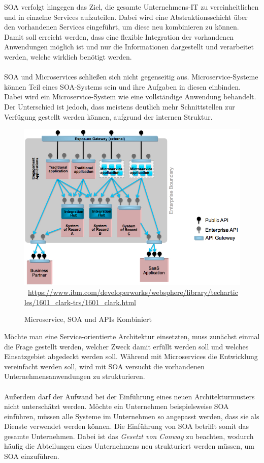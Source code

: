 SOA verfolgt hingegen das Ziel, die gesamte Unternehmens-IT zu vereinheitlichen und in einzelne Services aufzuteilen. Dabei wird eine Abstraktionsschicht über den vorhandenen Services eingeführt, um diese neu kombinieren zu können. Damit soll erreicht werden, dass eine flexible Integration der vorhandenen Anwendungen möglich ist und nur die Informationen dargestellt und verarbeitet werden, welche wirklich benötigt werden.
\\\\
SOA und Microservices schließen sich nicht gegenseitig aus. Microservice-Systeme können Teil eines SOA-Systems sein und ihre Aufgaben in diesen einbinden. Dabei wird ein Microservice-System wie eine vollständige Anwendung behandelt. Der  Unterschied ist jedoch, dass meistens deutlich mehr Schnittstellen zur Verfügung gestellt werden können, aufgrund der internen Struktur.
\begin{figure}[htb]
    \centering 
    \includegraphics[width=\textwidth]{content/images/figure8}\
    \quelle\url{https://www.ibm.com/developerworks/websphere/library/techarticles/1601_clark-trs/1601_clark.html}
    \caption{Microservice, SOA und APIs Kombiniert}
    \label{fig:MicroservicesSOAAndAPIsCombined} 
\end{figure}

Möchte man eine Service-orientierte Architektur einsetzten, muss zunächst einmal die Frage gestellt werden, welcher Zweck damit erfüllt werden soll und welches Einsatzgebiet abgedeckt werden soll. Während mit Microservices die Entwicklung vereinfacht werden soll, wird mit SOA versucht die vorhandenen Unternehmensanwendungen zu strukturieren.
\\\\
Außerdem darf der Aufwand bei der Einführung eines neuen Architekturmusters nicht unterschätzt werden. Möchte ein Unternehmen beispielsweise SOA einführen, müssen alle Systeme im Unternehmen so angepasst werden, dass sie als Dienste verwendet werden können. Die Einführung von SOA betrifft somit das gesamte Unternehmen. Dabei ist das \textit{Gesetzt von Conway} zu beachten, wodurch häufig die Abteilungen eines Unternehmens neu strukturiert werden müssen, um SOA einzuführen. 

